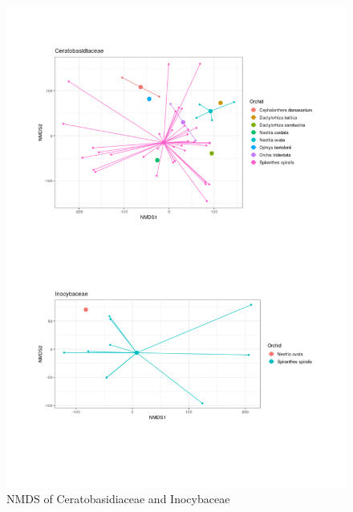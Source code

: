 \begin{figure}[htbp]
\centering
\includegraphics[keepaspectratio,width=\textwidth,height=0.75\textheight]{images/NMDScerino.png}
\caption{NMDS of Ceratobasidiaceae and Inocybaceae}
\end{figure}

